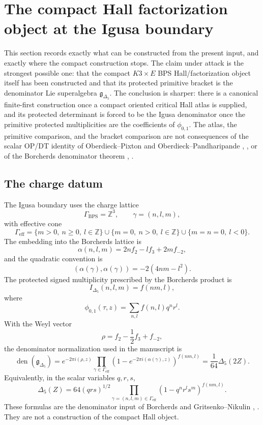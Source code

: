 \section{The compact Hall factorization object at the Igusa boundary}
\label{sec:compact-hall-factorization-object}

\providecommand{\Z}{\mathbb Z}
\providecommand{\GammaBPS}{\Gamma_{\mathrm{BPS}}}
\providecommand{\Gammaeff}{\Gamma_{\mathrm{eff}}}
\providecommand{\Hall}{\mathcal H}
\providecommand{\Prim}{\operatorname{Prim}}
\providecommand{\sdim}{\operatorname{sdim}}
\providecommand{\BM}{\operatorname{BM}}
\providecommand{\Crit}{\operatorname{Crit}}
\providecommand{\van}{\varphi}
\providecommand{\eps}{\varepsilon}

This section records exactly what can be constructed from the present
input, and exactly where the compact construction stops.  The claim
under attack is the strongest possible one: that the compact
\(K3\times E\) BPS Hall/factorization object itself has been constructed
and that its protected primitive bracket is the denominator Lie
superalgebra \(\mathfrak g_{\Delta_5}\).  The conclusion is sharper:
there is a canonical finite-first construction once a compact oriented
critical Hall atlas is supplied, and its protected determinant is forced
to be the Igusa denominator once the primitive protected multiplicities
are the coefficients of \(\phi_{0,1}\).  The atlas, the primitive
comparison, and the bracket comparison are not consequences of the
scalar OP/DT identity of Oberdieck--Pixton and
Oberdieck--Pandharipande \cite{OB}, \cite{OPand}, or of the Borcherds
denominator theorem \cite{B}, \cite{GN}.

\subsection{The charge datum}

The Igusa boundary uses the charge lattice
\[
  \GammaBPS=\Z^3,\qquad
  \gamma=(n,l,m),
\]
with effective cone
\[
  \Gammaeff=
  \{m>0,\ n\geq 0,\ l\in\Z\}
  \cup
  \{m=0,\ n>0,\ l\in\Z\}
  \cup
  \{m=n=0,\ l<0\}.
\]
The embedding into the Borcherds lattice is
\[
  \alpha(n,l,m)=2n f_2-l f_3+2m f_{-2},
\]
and the quadratic convention is
\[
  (\alpha(\gamma),\alpha(\gamma))=-2(4nm-l^2).
\]
The protected signed multiplicity prescribed by the Borcherds product is
\[
  I_{\Delta_5}(n,l,m)=f(nm,l),
\]
where
\[
  \phi_{0,1}(\tau,z)=\sum_{n,l} f(n,l)q^n r^l .
\]
With the Weyl vector
\[
  \rho=f_2-\frac12 f_3+f_{-2},
\]
the denominator normalization used in the manuscript is
\[
  \operatorname{den}(\mathfrak g_{\Delta_5})
  =
  e^{-2\pi i(\rho,z)}
  \prod_{\gamma\in\Gammaeff}
  \left(1-e^{-2\pi i(\alpha(\gamma),z)}\right)^{f(nm,l)}
  =
  \frac{1}{64}\Delta_5(2Z).
\]
Equivalently, in the scalar variables \(q,r,s\),
\[
  \Delta_5(Z)
  =
  64(qrs)^{1/2}
  \prod_{\gamma=(n,l,m)\in\Gammaeff}
  (1-q^n r^l s^m)^{f(nm,l)} .
\]
These formulas are the denominator input of Borcherds and
Gritsenko--Nikulin \cite{B}, \cite{GN}.  They are not a construction of
the compact Hall object.

